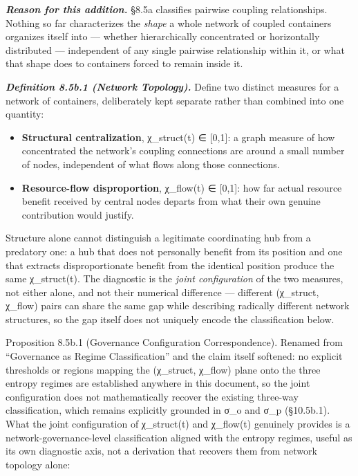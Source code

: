 \documentclass[
]{article}
\begin{document}
\emph{\textbf{Reason for this addition.}} §8.5a classifies pairwise
coupling relationships. Nothing so far characterizes the \emph{shape} a
whole network of coupled containers organizes itself into --- whether
hierarchically concentrated or horizontally distributed --- independent
of any single pairwise relationship within it, or what that shape does
to containers forced to remain inside it.

\emph{\textbf{Definition 8.5b.1 (Network Topology).}} Define two
distinct measures for a network of containers, deliberately kept
separate rather than combined into one quantity:

\begin{itemize}
\item
  \textbf{Structural centralization}, χ\_struct(t) ∈ {[}0,1{]}: a graph
  measure of how concentrated the network's coupling connections are
  around a small number of nodes, independent of what flows along those
  connections.
\item
  \textbf{Resource-flow disproportion}, χ\_flow(t) ∈ {[}0,1{]}: how far
  actual resource benefit received by central nodes departs from what
  their own genuine contribution would justify.
\end{itemize}

Structure alone cannot distinguish a legitimate coordinating hub from a
predatory one: a hub that does not personally benefit from its position
and one that extracts disproportionate benefit from the identical
position produce the same χ\_struct(t). The diagnostic is the
\emph{joint configuration} of the two measures, not either alone, and
not their numerical difference --- different (χ\_struct, χ\_flow) pairs
can share the same gap while describing radically different network
structures, so the gap itself does not uniquely encode the
classification below.

Proposition 8.5b.1 (Governance Configuration Correspondence). Renamed
from ``Governance as Regime Classification'' and the claim itself
softened: no explicit thresholds or regions mapping the (χ\_struct,
χ\_flow) plane onto the three entropy regimes are established anywhere
in this document, so the joint configuration does not mathematically
recover the existing three-way classification, which remains explicitly
grounded in σ\_o and σ\_p (§10.5b.1). What the joint configuration of
χ\_struct(t) and χ\_flow(t) genuinely provides is a
network-governance-level classification aligned with the entropy
regimes, useful as its own diagnostic axis, not a derivation that
recovers them from network topology alone:
\end{document}
